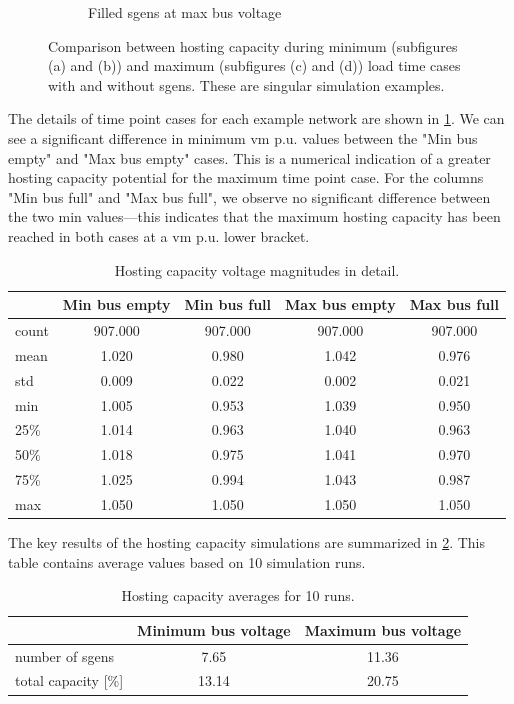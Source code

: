 \documentclass[a4paper,10pt]{report}
\begin{document}
\begin{figure}
\begin{subfigure}[b]{0.475\textwidth}
		\caption[]
		{{\small Filled sgens at max bus voltage}}    
		\label{hopsting_cap_figures_d}
	\end{subfigure}
	\caption[Comparison of hosting capacities for time extremes]
	{\small Comparison between hosting capacity during minimum (subfigures (a) and (b)) and maximum (subfigures (c) and (d)) load time cases with and without sgens. These are singular simulation examples.} 
	\label{hopsting_cap_figures}
\end{figure}
\FloatBarrier

The details of time point cases for each example network are shown in \cref{extremes_summary}. We can see a significant difference in minimum vm p.u. values between the "Min bus empty" and "Max bus empty" cases. This is a numerical indication of a greater hosting capacity potential for the maximum time point case. For the columns "Min bus full" and "Max bus full", we observe no significant difference between the two min values---this indicates that the maximum hosting capacity has been reached in both cases at a vm p.u. lower bracket.

\begin{table}[htpb]
	\centering
	\begin{tabular}{lcccc}
		\toprule
		& Min bus empty & Min bus full & Max bus empty & Max bus full \\
		\midrule
		count & 907.000 & 907.000 & 907.000 & 907.000 \\
		mean & 1.020 & 0.980 & 1.042 & 0.976 \\
		std & 0.009 & 0.022 & 0.002 & 0.021 \\
		min & 1.005 & 0.953 & 1.039 & 0.950 \\
		25\% & 1.014 & 0.963 & 1.040 & 0.963 \\
		50\% & 1.018 & 0.975 & 1.041 & 0.970 \\
		75\% & 1.025 & 0.994 & 1.043 & 0.987 \\
		max & 1.050 & 1.050 & 1.050 & 1.050 \\
		\bottomrule
	\end{tabular}
	\caption[Hosting capacity voltage magnitudes in detail]{Hosting capacity voltage magnitudes in detail.}
	\label{extremes_summary}
\end{table}

The key results of the hosting capacity simulations are summarized in \cref{hosting_cap_stats}. This table contains average values based on 10 simulation runs.

\begin{table}[htpb]
	\centering
	\begin{tabular}{lcc}
		\toprule
		& Minimum bus voltage & Maximum bus voltage \\
		\midrule
		number of sgens & 7.65 & 11.36 \\
		total capacity [\%] & 13.14 & 20.75 \\
		\bottomrule
	\end{tabular}
	\caption[Hosting capacity results]{Hosting capacity averages for 10 runs.}
	\label{hosting_cap_stats}
\end{table}
\end{document}
